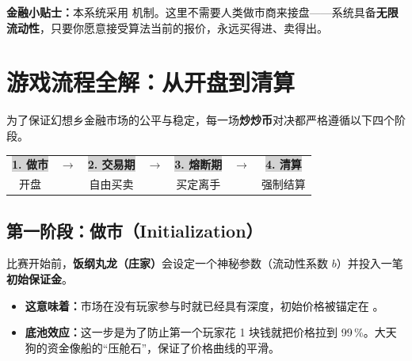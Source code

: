 \documentclass[11pt,a4paper,twoside]{article}
\begin{document}
\begin{tipbox}
\textbf{金融小贴士：}\;本系统采用  机制。这里不需要人类做市商来接盘——系统具备\textbf{无限流动性}，只要你愿意接受算法当前的报价，永远买得进、卖得出。
\end{tipbox}

\section{游戏流程全解：从开盘到清算}

为了保证幻想乡金融市场的公平与稳定，每一场\textbf{炒炒币}对决都严格遵循以下四个阶段。

\vspace{0.3em}
\noindent
\begin{tcolorbox}[colback=white,colframe=rule,sharp corners,boxrule=0.8pt,left=4pt,right=4pt,top=4pt,bottom=4pt]
\sffamily\small\centering
\setlength{\tabcolsep}{2pt}
\begin{tabular}{@{}c c c c c c c@{}}
  \colorbox{lightGray}{\;\textbf{1. 做市}\;} & $\rightarrow$ &
  \colorbox{lightGray}{\;\textbf{2. 交易期}\;} & $\rightarrow$ &
  \colorbox{lightGray}{\;\textbf{3. 熔断期}\;} & $\rightarrow$ &
  \colorbox{lightGray}{\;\textbf{4. 清算}\;} \\
  \textcolor{soft}{开盘} & &
  \textcolor{soft}{自由买卖} & &
  \textcolor{soft}{买定离手} & &
  \textcolor{soft}{强制结算} \\
\end{tabular}
\end{tcolorbox}

\subsection{第一阶段：做市（Initialization）}

比赛开始前，\textbf{饭纲丸龙（庄家）}会设定一个神秘参数（流动性系数 $b$）并投入一笔\textbf{初始保证金}。

\begin{itemize}
  \item \textbf{这意味着：}市场在没有玩家参与时就已经具有深度，初始价格被锚定在 。
  \item \textbf{底池效应：}这一步是为了防止第一个玩家花 1 块钱就把价格拉到 99\,\%。大天狗的资金像船的“压舱石”，保证了价格曲线的平滑。
\end{itemize}
\end{document}
